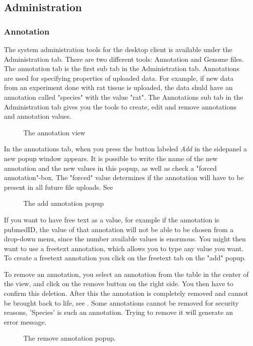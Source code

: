 \subsection{Administration}
\subsubsection{Annotation}

The system administration tools for the desktop client is available under the Administration tab. There are two different tools: Annotation and Genome files. The annotation tab is the first sub tab in the Administration tab. Annotations are used for specifying properties of uploaded data. For example, if new data from an experiment done with rat tissue is uploaded, the data shuld have an annotation called "species" with the value "rat". The Annotations sub tab in the Administration tab gives you the tools to create, edit and remove annotations and annotation values. 
\begin{figure}[htb]
	\caption{The annotation view}
	\label{fig:annotationsView}
\end{figure}

In the annotations tab, when you press the button labeled \textit{Add} in the sidepanel a new popup window appears. It is possible to write the name of the new annotation and the new values in this popup, as well as check a "forced annotation"-box. The "forced" value determines if the annotation will have to be present in all future file uploads. See 

\begin{figure}[htb]
	\caption{The add annotation popup}
	\label{fig:adm_addAnnotationPopup}
\end{figure}

If you want to have free text as a value, for example if the annotation is pubmedID, the value of that annotation will not be able to be chosen from a drop-down menu, since the number available values is enormous. You might then want to use a freetext annotation, which allows you to type any value you want. To create a freetext annotation you click on the freetext tab on the "add" popup. 


To remove an annotation, you select an annotation from the table in the center of the view, and click on the remove button on the right side. You then have to confirm this deletion. After this the annotation is completely removed and cannot be brought back to life, see . Some annotations cannot be removed for security reasons, 'Species' is such an annotation. Trying to remove it will generate an error message.
\begin{figure}[h!]
\caption{The remove annotation popup.}
\label{fig:adm_desktopRemoveAnnotation}
\end{figure}
